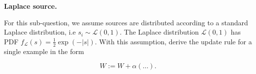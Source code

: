 \item {} \textbf{Laplace source.}

For this sub-question, we assume sources are distributed according to a standard Laplace distribution, i.e $s_i \sim \mathcal{L}(0,1)$. The Laplace distribution $\mathcal{L}(0,1)$ has PDF $f_{\mathcal{L}}(s) = \frac{1}{2}\exp\left(-|s|  \right)$. With this assumption, derive the update rule for a single example in the form
    
    $$ W := W + \alpha \left(\ldots\right).$$
    
